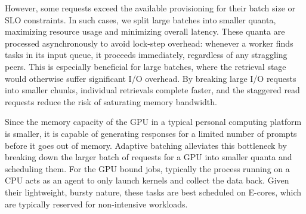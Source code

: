 However, some requests exceed the available provisioning for their batch size or SLO constraints. In such cases, we split large batches into smaller quanta, maximizing resource usage and minimizing overall latency. These quanta are processed asynchronously to avoid lock-step overhead: whenever a worker finds tasks in its input queue, it proceeds immediately, regardless of any straggling peers. This is especially beneficial for large batches, where the retrieval stage would otherwise suffer significant I/O overhead. By breaking large I/O requests into smaller chunks, individual retrievals complete faster,
and the staggered read requests reduce the risk of saturating memory bandwidth. 

Since the memory capacity of the GPU in a typical personal computing platform is smaller, it is capable of generating responses for a limited number of prompts before it goes out of memory. Adaptive batching alleviates this bottleneck by breaking down the larger batch of requests for a GPU into smaller quanta and scheduling them. For the GPU bound jobs, typically the process running on a CPU acts as an agent to only launch kernels and collect the data back. 
Given their lightweight, bursty nature, these tasks are best scheduled on E-cores, which are typically reserved for non-intensive workloads.

